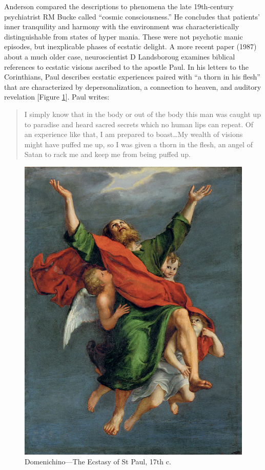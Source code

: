 \documentclass{UIdahoMastersThesis}
\begin{document}
Anderson compared the descriptions to phenomena the late 19th-century psychiatrist RM Bucke called ``cosmic consciousness.'' He concludes that patients' inner tranquility and harmony with the environment was characteristically distinguishable from states of hyper mania. These were not psychotic manic episodes, but inexplicable phases of ecstatic delight.
A more recent paper (1987) about a much older case, neuroscientist D Landsboroug examines biblical references to ecstatic visions ascribed to the apostle Paul. In his letters to the Corinthians, Paul describes ecstatic experiences paired with ``a thorn in his flesh'' that are characterized by depersonalization, a connection to heaven, and auditory revelation [Figure \ref{fig:paul}]. Paul writes:

\begin{quote}
{I simply know that in the body or out of the body this man was caught up to paradise and heard sacred secrets which no human lips can repeat. Of an experience like that, I am prepared to boast\ldots My wealth of visions might have puffed me up, so I was given a thorn in the flesh, an angel of Satan to rack me and keep me from being puffed up.}\cite{bible_new_1984}
\end{quote}

\begin{figure}[h!]
	\centering
	\includegraphics[width=0.63\linewidth]{paul.jpg}
	\caption{Domenichino---The Ecstasy of St Paul, 17th c.}
	\label{fig:paul}
\end{figure}
\end{document}
